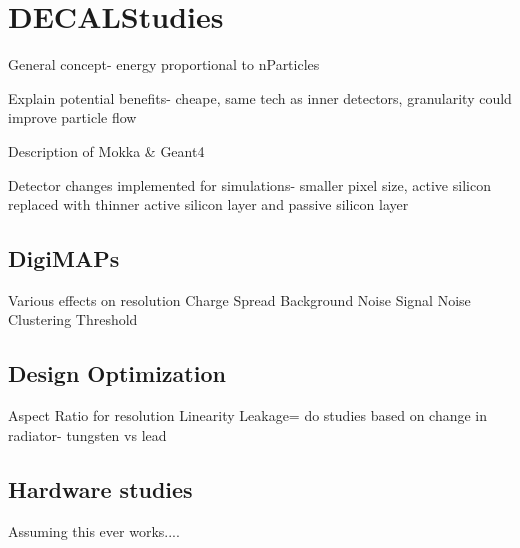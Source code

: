 \chapter{DECALStudies}
\label{sect:DECAL}
General concept- energy proportional to nParticles

Explain potential benefits- cheape, same tech as inner detectors, granularity could improve particle flow


Description of Mokka \& Geant4

Detector changes implemented for simulations- smaller pixel size, active silicon replaced with thinner active silicon layer and passive silicon layer
 

\section{DigiMAPs}
Various effects on resolution
Charge Spread
Background Noise
Signal Noise
Clustering
Threshold

\section{Design Optimization}
Aspect Ratio for resolution
Linearity
Leakage= do studies based on change in radiator- tungsten vs lead


\section{Hardware studies}
Assuming this ever works....
